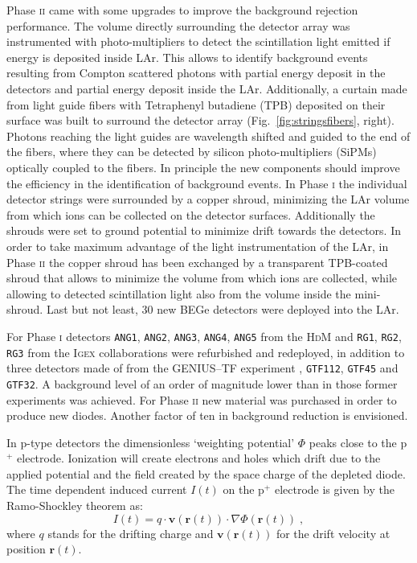 Phase \textsc{ii} came with some upgrades to improve the background rejection performance. The volume directly surrounding the detector array was instrumented with photo-multipliers to detect the scintillation light emitted if energy is deposited inside LAr. This allows to identify background events resulting from Compton scattered photons with partial energy deposit in the detectors and partial energy deposit inside the LAr. Additionally, a curtain made from light guide fibers with Tetraphenyl butadiene (TPB) deposited on their surface was built to surround the detector array (Fig.~\ref{fig:stringsfibers}, right). Photons reaching the light guides are wavelength shifted and guided to the end of the fibers, where they can be detected by silicon photo-multipliers (SiPMs) optically coupled to the fibers. In principle the new components should improve the efficiency in the identification of background events. In Phase \textsc{i} the individual detector strings were surrounded by a copper shroud, minimizing the LAr volume from which  ions can be collected on the detector surfaces. Additionally the shrouds were set to ground potential to minimize drift towards the detectors. In order to take maximum advantage of the light instrumentation of the LAr, in Phase \textsc{ii} the copper shroud has been exchanged by a transparent TPB-coated shroud that allows to minimize the volume from which  ions are collected, while allowing to detected scintillation light also from the volume inside the mini-shroud. Last but not least, 30 new BEGe detectors were deployed into the LAr.

 For Phase \textsc{i} detectors \texttt{ANG1}, \texttt{ANG2}, \texttt{ANG3}, \texttt{ANG4}, \texttt{ANG5} from the \textsc{HdM} \cite{hdm} and \texttt{RG1}, \texttt{RG2}, \texttt{RG3} from the \textsc{Igex} \cite{igex} collaborations were refurbished and redeployed, in addition to three detectors made of  from the GENIUS--TF experiment \cite{genius1, genius2}, \texttt{GTF112}, \texttt{GTF45} and \texttt{GTF32}. A background level of an order of magnitude lower than in those former experiments was achieved. For Phase \textsc{ii} new material was purchased in order to produce new diodes. Another factor of ten in background reduction is envisioned.

In p-type detectors the dimensionless `weighting potential' $\Phi$ peaks close to the p$^+$ electrode. Ionization will create electrons and holes which drift due to the applied potential and the field created by the space charge of the depleted diode. The time dependent induced current $I(t)$ on the p$^+$ electrode is given by the Ramo-Shockley theorem \cite{schockley-ramo} as:
\[I(t)=q\cdot\mathbf{v}(\mathbf{r}(t))\cdot\nabla\Phi(\mathbf{r}(t))\;,\]
where $q$ stands for the drifting charge and $\mathbf{v}(\mathbf{r}(t))$ for the drift velocity at position $\mathbf{r}(t)$.

